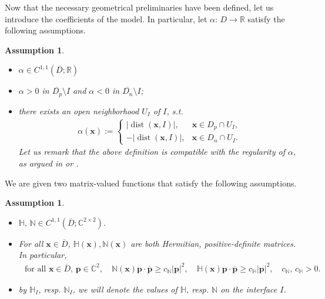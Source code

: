\documentclass[report]{elsarticle}
\newtheorem{assumption}[theorem]{Assumption}
\numberwithin{theorem}{section}
\newcommand{\bx}{\mathbf{x}}
\renewcommand{\vec}[1]{\mathbf{#1}}
\begin{document}
Now that the necessary geometrical preliminaries have been defined, let us introduce the coefficients of the model. In particular, let $\alpha: \, D\rightarrow \mathbb{R}$ satisfy the following assumptions. 
\begin{assumption}
	\label{assump:alpha}
	\begin{itemize}
		\item $\alpha\in C^{1,1}(\overline{D}; \mathbb{R})$
		\item $\alpha>0$ in $\overline{D_p}\setminus I$ and $\alpha<0$ in $\overline{D_n}\setminus I$;
		\item there exists an open neighborhood $U_I$ of $I$, s.t. 
		\begin{align}
			\label{eq:signed_distance}
			\alpha(\vec{x}):=\left\{
			\begin{array}{ll}
				\left|\operatorname{dist}(\vec{x},I)\right|,  & \vec{x}\in D_p\cap U_I,\\
				-\left|\operatorname{dist}(\vec{x},I)\right|, & \vec{x}\in D_{n}\cap U_I.
			\end{array}
			\right.
		\end{align} 
		Let us remark that the above definition is compatible with the regularity of $\alpha$, as argued in \cite{krantz_parks} or \cite[the proof of Lemma 14.6]{gilbrag_trudinger}. 
	\end{itemize}
\end{assumption}
We are given two matrix-valued functions that satisfy the following assumptions. 
\begin{assumption}
	\label{assump:matrices_general}
	\begin{itemize}
		\item $\mathbb{H}, \, \mathbb{N}\in {C}^{1,1}(\overline{D}; \mathbb{C}^{2\times 2})$. 
		\item For all $\bx\in \overline{D}$, $\mathbb{H}(\bx), \mathbb{N}(\bx)$ are both Hermitian, positive-definite matrices. In particular, 
		\begin{align*}
			\text{ for all }\bx\in \overline{D}, \, \vec{p}\in \mathbb{C}^2, \quad 	\mathbb{N}(\bx)\vec{p}\cdot \overline{\vec{p}}\geq c_{\mathbb{N}}|\vec{p}|^2, \quad 		\mathbb{H}(\bx)\vec{p}\cdot\overline{\vec{p}}\geq c_{\mathbb{H}}|\vec{p}|^2, \quad c_{\mathbb{N}}, \, c_{\mathbb{H}}>0.  
		\end{align*}
		\item by $\mathbb{H}_{I}$, resp. $\mathbb{N}_I$, we will denote the values of $\mathbb{H}$, resp. $\mathbb{N}$ on the interface $I$.
	\end{itemize}
\end{assumption}
\end{document}
